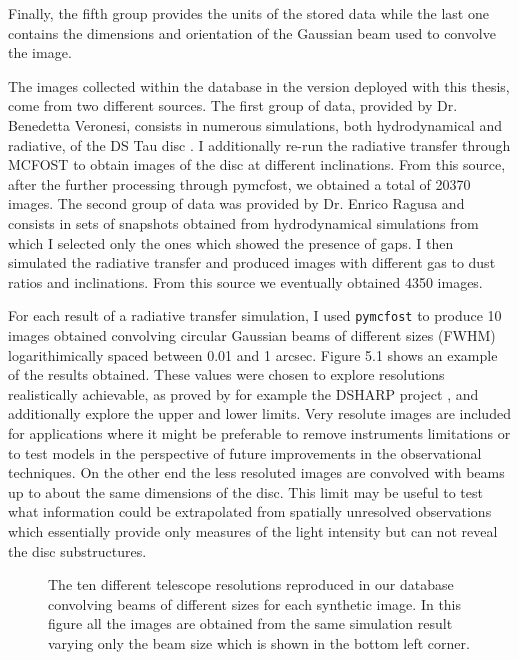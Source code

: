 \documentclass[a4paper,10pt]{report}
\begin{document}
Finally, the fifth group provides the units of the stored data while the last one contains
the dimensions and orientation of the Gaussian beam used to convolve the image.

The images collected within the database in the version deployed with this thesis, come from two different sources.
The first group of data, provided by Dr. Benedetta Veronesi, consists in numerous simulations,
both hydrodynamical and radiative,
of the DS Tau disc \cite{dstauv}. 
I additionally re-run the radiative transfer through MCFOST to obtain images of the disc at different inclinations.
From this source, after the further processing through pymcfost, we obtained a total of 20370 images.
The second group of data was provided by Dr. Enrico Ragusa and consists in sets of snapshots
obtained from hydrodynamical simulations from which I selected only the ones which showed the presence of gaps.
I then simulated the radiative transfer and produced images with different gas to dust ratios and inclinations.
From this source we eventually obtained 4350 images.

For each result of a radiative transfer simulation, I used \lstinline{pymcfost} to produce 10 images obtained convolving circular 
Gaussian beams of different sizes (FWHM)
logarithimically spaced between 0.01 and 1 arcsec. Figure 5.1 shows an example of the results obtained.
These values were chosen to explore resolutions
realistically achievable, as proved by for example the DSHARP project \cite{dsharp}, and additionally explore the upper and lower limits.
Very resolute images are included for applications where it might be preferable to remove instruments limitations
or to test models in the perspective of future improvements in the observational techniques. 
On the other end the less resoluted images are convolved with beams up to about the same dimensions of the disc. 
This limit may be useful to test what information could be extrapolated from spatially unresolved observations
which essentially provide only measures of the light intensity but can not reveal the disc substructures.

\begin{figure}
    \begin{center}
        \scalebox{0.4}{}
    \end{center}
    \caption{The ten different telescope resolutions reproduced in our database 
    convolving beams of different sizes for each synthetic image. 
    In this figure all the images are obtained from the same simulation result varying only the
    beam size which
    is shown in the bottom left corner.}
\end{figure}
\end{document}
